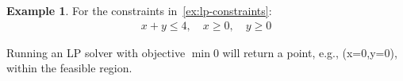 \documentclass[oneside,11pt,dvipsnames]{book}
\numberwithin{equation}{section}
\theoremstyle{definition}
\newtheorem{example}{Example}[section]
\theoremstyle{remark}
\begin{document}

\begin{example}

For the constraints in~\autoref{ex:lp-constraints}:
\begin{align}
x+y \le 4,\quad x\ge 0,\quad y\ge 0
\end{align}

Running an LP solver with objective $\min 0$ will return a point, e.g., (x=0,y=0), within the feasible region.
\end{example}





\end{document}
